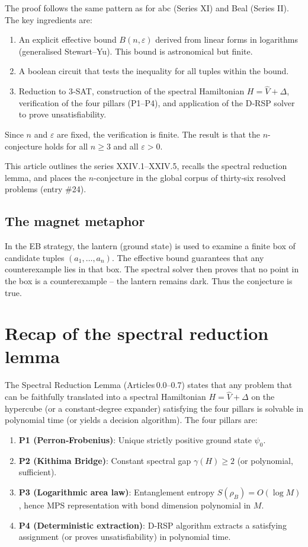 \documentclass[11pt,a4paper]{article}
\begin{document}
The proof follows the same pattern as for abc (Series XI) and Beal (Series II). The key ingredients are:
\begin{enumerate}
\item An explicit effective bound $B(n,\varepsilon)$ derived from linear forms in logarithms (generalised Stewart–Yu). This bound is astronomical but finite.
\item A boolean circuit that tests the inequality for all tuples within the bound.
\item Reduction to 3‑SAT, construction of the spectral Hamiltonian $H = \hat{V} + \Delta$, verification of the four pillars (P1–P4), and application of the D‑RSP solver to prove unsatisfiability.
\end{enumerate}
Since $n$ and $\varepsilon$ are fixed, the verification is finite. The result is that the $n$-conjecture holds for all $n\ge 3$ and all $\varepsilon>0$.

This article outlines the series XXIV.1–XXIV.5, recalls the spectral reduction lemma, and places the $n$-conjecture in the global corpus of thirty‑six resolved problems (entry \#24).

\subsection*{The magnet metaphor}

In the EB strategy, the lantern (ground state) is used to examine a finite box of candidate tuples $(a_1,\dots,a_n)$. The effective bound guarantees that any counterexample lies in that box. The spectral solver then proves that no point in the box is a counterexample – the lantern remains dark. Thus the conjecture is true.

\section{Recap of the spectral reduction lemma}

The Spectral Reduction Lemma (Articles 0.0–0.7) states that any problem that can be faithfully translated into a spectral Hamiltonian $H = \hat{V} + \Delta$ on the hypercube (or a constant‑degree expander) satisfying the four pillars is solvable in polynomial time (or yields a decision algorithm). The four pillars are:

\begin{enumerate}
\item \textbf{P1 (Perron‑Frobenius)}: Unique strictly positive ground state $\psi_0$.
\item \textbf{P2 (Kithima Bridge)}: Constant spectral gap $\gamma(H) \ge 2$ (or polynomial, sufficient).
\item \textbf{P3 (Logarithmic area law)}: Entanglement entropy $S(\rho_B)=O(\log M)$, hence MPS representation with bond dimension polynomial in $M$.
\item \textbf{P4 (Deterministic extraction)}: D‑RSP algorithm extracts a satisfying assignment (or proves unsatisfiability) in polynomial time.
\end{enumerate}
\end{document}
